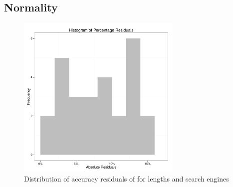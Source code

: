 \documentclass{csfourzero}
\begin{document}
\subsection{Normality}
\begin{figure}[H]
  \centerline{\includegraphics[width=0.7\textwidth]{residual_histogram}}
  \caption{Distribution of accuracy residuals of for lengths and search engines}\label{fig:9searchengines}
\end{figure}
\end{document}
